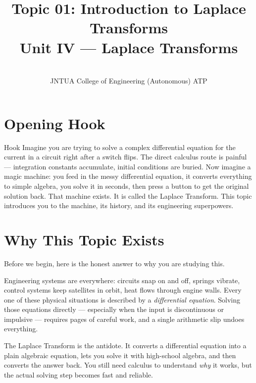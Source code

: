 \documentclass[12pt,a4paper]{article}
\title{Topic 01: Introduction to Laplace Transforms \\
       \large Unit IV --- Laplace Transforms}
\author{ \\
        JNTUA College of Engineering (Autonomous) ATP}
\date{}
\begin{document}
\maketitle
\tableofcontents
\newpage

\section{Opening Hook}
\begin{curiositybox}{Hook}
Imagine you are trying to solve a complex differential equation for the current
in a circuit right after a switch flips.  The direct calculus route is
painful --- integration constants accumulate, initial conditions are buried.
Now imagine a magic machine: you feed in the messy differential equation, it
converts everything to simple algebra, you solve it in seconds, then press a
button to get the original solution back.  That machine exists.  It is called
the Laplace Transform.  This topic introduces you to the machine, its history,
and its engineering superpowers.
\end{curiositybox}

\section{Why This Topic Exists}

Before we begin, here is the honest answer to why you are studying this.

Engineering systems are everywhere: circuits snap on and off, springs vibrate,
control systems keep satellites in orbit, heat flows through engine walls.
Every one of these physical situations is described by a \emph{differential
equation}.  Solving those equations directly --- especially when the input is
discontinuous or impulsive --- requires pages of careful work, and a single
arithmetic slip undoes everything.

The Laplace Transform is the antidote.  It converts a differential equation
into a plain algebraic equation, lets you solve it with high-school algebra,
and then converts the answer back.  You still need calculus to understand
\emph{why} it works, but the actual solving step becomes fast and reliable.
\end{document}
